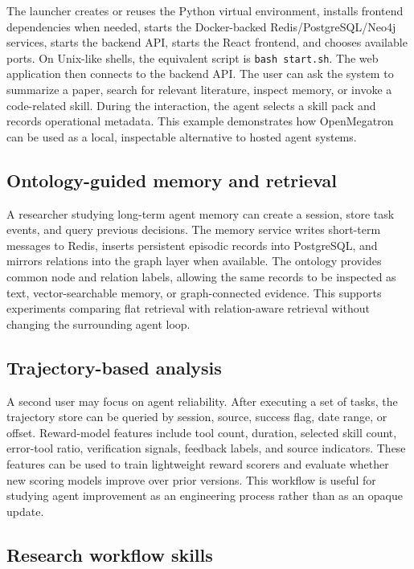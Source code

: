 \documentclass[preprint,12pt,a4paper]{elsarticle}
\begin{document}
The launcher creates or reuses the Python virtual environment, installs frontend dependencies when needed, starts the Docker-backed Redis/PostgreSQL/Neo4j services, starts the backend API, starts the React frontend, and chooses available ports. On Unix-like shells, the equivalent script is \texttt{bash start.sh}. The web application then connects to the backend API. The user can ask the system to summarize a paper, search for relevant literature, inspect memory, or invoke a code-related skill. During the interaction, the agent selects a skill pack and records operational metadata. This example demonstrates how OpenMegatron can be used as a local, inspectable alternative to hosted agent systems.

\subsection{Ontology-guided memory and retrieval}

A researcher studying long-term agent memory can create a session, store task events, and query previous decisions. The memory service writes short-term messages to Redis, inserts persistent episodic records into PostgreSQL, and mirrors relations into the graph layer when available. The ontology provides common node and relation labels, allowing the same records to be inspected as text, vector-searchable memory, or graph-connected evidence. This supports experiments comparing flat retrieval with relation-aware retrieval without changing the surrounding agent loop.

\subsection{Trajectory-based analysis}

A second user may focus on agent reliability. After executing a set of tasks, the trajectory store can be queried by session, source, success flag, date range, or offset. Reward-model features include tool count, duration, selected skill count, error-tool ratio, verification signals, feedback labels, and source indicators. These features can be used to train lightweight reward scorers and evaluate whether new scoring models improve over prior versions. This workflow is useful for studying agent improvement as an engineering process rather than as an opaque update.

\subsection{Research workflow skills}
\end{document}
